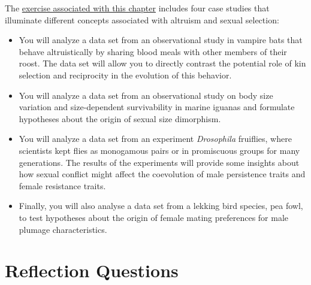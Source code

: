 \documentclass[
]{book}
\begin{document}
The \href{exercises/BIOL520-ex9.zip}{exercise associated with this chapter} includes four case studies that illuminate different concepts associated with altruism and sexual selection:

\begin{itemize}
\item
  You will analyze a data set from an observational study in vampire bats that behave altruistically by sharing blood meals with other members of their roost. The data set will allow you to directly contrast the potential role of kin selection and reciprocity in the evolution of this behavior.
\item
  You will analyze a data set from an observational study on body size variation and size-dependent survivability in marine iguanas and formulate hypotheses about the origin of sexual size dimorphism.
\item
  You will analyze a data set from an experiment \emph{Drosophila} fruiflies, where scientists kept flies as monogamous pairs or in promiscuous groups for many generations. The results of the experiments will provide some insights about how sexual conflict might affect the coevolution of male persistence traits and female resistance traits.
\item
  Finally, you will also analyse a data set from a lekking bird species, pea fowl, to test hypotheses about the origin of female mating preferences for male plumage characteristics.
\end{itemize}

\hypertarget{reflection-questions-9}{%
\section{Reflection Questions}\label{reflection-questions-9}}
\end{document}
